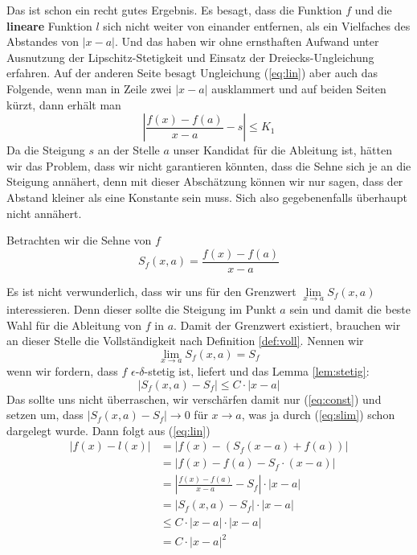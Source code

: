 Das ist schon ein recht gutes Ergebnis. Es besagt, dass die Funktion $f$ und die \textbf{lineare} Funktion $l$ sich nicht weiter von einander entfernen, als ein Vielfaches des Abstandes von $|x-a|$. Und das haben wir ohne ernsthaften Aufwand unter Ausnutzung der Lipschitz-Stetigkeit und Einsatz der Dreiecks-Ungleichung erfahren. Auf der anderen Seite besagt Ungleichung (\ref{eq:lin}) aber auch das Folgende, wenn man in Zeile zwei $|x-a|$ ausklammert und auf beiden Seiten kürzt, dann erhält man
\begin{equation}\label{eq:const}
\left| \frac{f(x)-f(a)}{x-a} -s \right| \le K_1
\end{equation}
Da die Steigung $s$ an der Stelle $a$ unser Kandidat für die Ableitung ist, hätten wir das Problem, dass wir nicht garantieren könnten, dass die Sehne sich je an die Steigung annähert, denn mit dieser Abschätzung können wir nur sagen, dass der Abstand kleiner als eine Konstante sein muss. Sich also gegebenenfalls überhaupt nicht annähert.


Betrachten wir die Sehne von $f$
\begin{equation*}
S_f(x,a) = \frac{f(x)-f(a)}{x-a}
\end{equation*}

Es ist nicht verwunderlich, dass wir uns für den Grenzwert $\lim\limits_{x\rightarrow a} S_f(x,a)$ interessieren. Denn dieser sollte die Steigung im Punkt $a$ sein und damit die beste Wahl für die Ableitung von $f$ in $a$. Damit der Grenzwert existiert, brauchen wir an dieser Stelle die Vollständigkeit nach Definition \ref{def:voll}. Nennen wir 
\begin{equation}\label{eq:slim}
\lim\limits_{x\rightarrow a} S_f(x,a) = S_f
\end{equation}
wenn wir fordern, dass $f$ $\epsilon$-$\delta$-stetig ist, liefert und das Lemma \ref{lem:stetig}: 
\[
|S_f(x,a) - S_f| \le C\cdot |x-a|
\]
Das sollte uns nicht überraschen, wir verschärfen damit nur (\ref{eq:const}) und setzen um, dass $|S_f(x,a) - S_f| \rightarrow 0$ für $x\rightarrow a$, was ja durch (\ref{eq:slim}) schon dargelegt wurde.
Dann folgt aus (\ref{eq:lin})
\begin{equation}
\begin{split}
|f(x)-l(x)| &= |f(x)-(S_f(x-a)+f(a))| \\
&= |f(x)-f(a) -S_f\cdot (x-a)| \\
&= \left| \frac{f(x)-f(a)}{x-a} -S_f \right| \cdot |x-a| \\
&= \left| S_f(x,a) -S_f \right| \cdot |x-a| \\
&\le C\cdot |x-a| \cdot |x-a| \\
&= C\cdot |x-a|^2
\end{split}
\end{equation}

